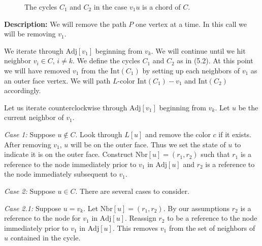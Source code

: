 \documentclass[letterpaper, 12pt]{article}
\theoremstyle{definition}
\theoremstyle{definition}
\theoremstyle{thm}
\theoremstyle{definition}
\begin{document}
\begin{figure}
\begin{center}
\end{center}

\caption{The cycles $C_1$ and $C_2$ in the case $v_1u$ is a chord of $C$.}
\end{figure}

\noindent\textbf{Description:} We will remove the path $P$ one vertex at a
time. In this call we will be removing $v_1$.

We iterate through $\text{Adj}[v_1]$ beginning from $v_k$. We will continue
until we hit neighbor $v_i\in C$, $i\ne k$. We define the cycles $C_1$ and $C_2$
as in (5.2). At this point we will have removed $v_1$ from the $\text{Int}(C_1)$
by setting up each neighbors of $v_1$ as an outer face vertex. We will path
$L$-color $\text{Int}(C_1)-v_1$ and $\text{Int}(C_2)$ accordingly.

Let us iterate counterclockwise through $\text{Adj}[v_1]$ beginning from $v_k$.
Let $u$ be the current neighbor of $v_1$.

\textit{Case 1:} Suppose $u\not\in C$. Look through $L[u]$ and remove the color
$c$ if it exists. After removing $v_1$, $u$ will be on the
outer face. Thus we set the state of $u$ to indicate it is
on the outer face. Construct $\text{Nbr}[u]=(r_1,r_2)$ such that
$r_1$ is a reference to the node immediately prior to $v_1$ in $\text{Adj}[u]$
and $r_2$ is a reference to the node immediately subsequent to $v_1$.

\textit{Case 2:} Suppose $u\in C$. There are several cases to consider.

\textit{Case 2.1:} Suppose $u=v_k$. Let $\text{Nbr}[u]=(r_1,r_2)$. By our
assumptions $r_2$ is a reference to the node for $v_1$ in $\text{Adj}[u]$.
Reassign $r_2$ to be a reference to the node immediately prior to $v_1$ in
$\text{Adj}[u]$. This removes $v_1$ from the set of neighbors of $u$ contained
in the cycle.
\end{document}
